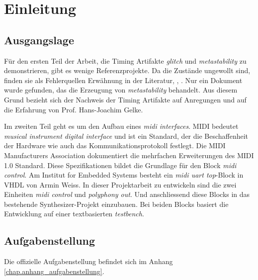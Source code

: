 
\chapter{Einleitung}\label{chap.einleitung}


\section{Ausgangslage}\label{sect.einleitung_ausgangslage}
Für den ersten Teil der Arbeit, die Timing Artifakte  \textit{glitch} und \textit{metastability} zu demonstrieren, gibt es wenige Referenzprojekte. Da die Zustände ungewollt sind, finden sie als Fehlerquellen Erwähnung in der Literatur\cite{ReferenceManual},  \cite{F_glitches}, \cite{F_metastability}. Nur ein Dokument wurde gefunden, das die Erzeugung von \textit{ metastability} behandelt\cite{Metastabil}. Aus diesem Grund bezieht sich der Nachweis der Timing Artifakte auf Anregungen und auf die Erfahrung von Prof. Hans-Joachim Gelke.


Im zweiten Teil geht es um den Aufbau eines \textit{midi interfaces}. MIDI bedeutet \textit{musical instrument digital interface} und ist ein Standard, der die Beschaffenheit der Hardware wie auch das Kommunikationsprotokoll festlegt\cite{Midi_Braut}. Die MIDI Manufacturers Association dokumentiert die mehrfachen Erweiterungen des MIDI 1.0 Standard\cite{Midi_specification}. Diese Spezifikationen bildet die Grundlage für den Block \textit{midi control}. Am Institut for Embedded Systems besteht ein \textit{midi uart top}-Block in VHDL von Armin Weiss. In dieser Projektarbeit zu entwickeln sind die zwei Einheiten \textit{midi control}  und \textit{polyphony out}. Und anschliessend diese Blocks in das bestehende Synthesizer-Projekt einzubauen. Bei beiden Blocks basiert die Entwicklung auf einer textbasierten \textit{testbench}.



\section{Aufgabenstellung}\label{sect.einleitung_ziele}
Die offizielle Aufgabenstellung befindet sich im Anhang \ref{chap.anhang_aufgabenstellung}. 
 
